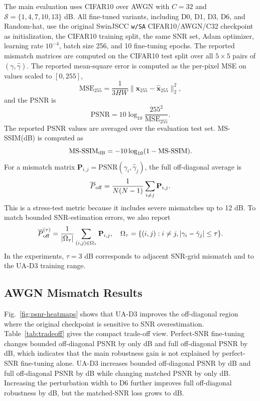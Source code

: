 \documentclass[10pt,journal]{IEEEtran}
\begin{document}
The main evaluation uses CIFAR10 over AWGN with $C=32$ and $\mathcal{S}=\{1,4,7,10,13\}$ dB. All fine-tuned variants, including D0, D1, D3, D6, and Random-hat, use the original SwinJSCC \texttt{w/SA} CIFAR10/AWGN/C32 checkpoint as initialization, the CIFAR10 training split, the same SNR set, Adam optimizer, learning rate $10^{-4}$, batch size 256, and 10 fine-tuning epochs. The reported mismatch matrices are computed on the CIFAR10 test split over all $5\times5$ pairs of $(\gamma,\hat{\gamma})$. The reported mean-square error is computed as the per-pixel MSE on values scaled to $[0,255]$,
\begin{equation}
\mathrm{MSE}_{255}=
\frac{1}{3HW}\|\mathbf{x}_{255}-\hat{\mathbf{x}}_{255}\|_2^2,
\label{eq:mse255}
\end{equation}
and the PSNR is
\begin{equation}
\mathrm{PSNR}=10\log_{10}\frac{255^2}{\mathrm{MSE}_{255}}.
\label{eq:psnr}
\end{equation}
The reported PSNR values are averaged over the evaluation test set.
MS-SSIM(dB) is computed as
\begin{equation}
\mathrm{MS\text{-}SSIM}_{\rm dB}
=-10\log_{10}(1-\mathrm{MS\text{-}SSIM}).
\label{eq:msssimdb}
\end{equation}
For a mismatch matrix $\mathbf{P}_{i,j}=\mathrm{PSNR}(\gamma_i,\hat{\gamma}_j)$, the full off-diagonal average is
\begin{equation}
\overline{P}_{\rm off}=
\frac{1}{N(N-1)}\sum_{i\ne j}\mathbf{P}_{i,j}.
\label{eq:offdiag}
\end{equation}
This is a stress-test metric because it includes severe mismatches up to 12 dB. To match bounded SNR-estimation errors, we also report
\begin{equation}
\overline{P}_{\rm off}^{(\tau)}=
\frac{1}{|\Omega_{\tau}|}
\sum_{(i,j)\in\Omega_{\tau}}\mathbf{P}_{i,j},
\quad
\Omega_{\tau}=\{(i,j):i\ne j, |\gamma_i-\hat{\gamma}_j|\le \tau\}.
\label{eq:bounded_offdiag}
\end{equation}
In the experiments, $\tau=3$ dB corresponds to adjacent SNR-grid mismatch and to the UA-D3 training range.

\subsection{AWGN Mismatch Results}



Fig.~\ref{fig:psnr-heatmaps} shows that UA-D3 improves the off-diagonal region where the original checkpoint is sensitive to SNR overestimation. Table~\ref{tab:tradeoff} gives the compact trade-off view. Perfect-SNR fine-tuning changes bounded off-diagonal PSNR by only \DZeroBoundedGain{} dB and full off-diagonal PSNR by \DZeroOffGain{} dB, which indicates that the main robustness gain is not explained by perfect-SNR fine-tuning alone. UA-D3 increases bounded off-diagonal PSNR by \DThreeBoundedGain{} dB and full off-diagonal PSNR by \DThreeOffGain{} dB while changing matched PSNR by only \DThreeDiagGain{} dB. Increasing the perturbation width to D6 further improves full off-diagonal robustness by \DSixOffGain{} dB, but the matched-SNR loss grows to \DSixDiagGain{} dB.
\end{document}
